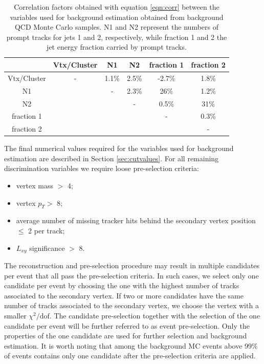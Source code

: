 \begin{table}[htbp]
\centering
\caption{Correlation factors obtained with equation \ref{eqn:corr} between the variables 
used for background estimation obtained from background QCD Monte
Carlo samples. N1 and N2 represent the numbers
of prompt tracks for jets 1 and 2, respectively, while fraction 1 and 2 the jet energy fraction carried by
prompt tracks.
\label{tab:corr}}
\begin{tabular}{c|ccccc}
 & Vtx/Cluster & N1 & N2 & fraction 1 & fraction 2 \\
\hline
Vtx/Cluster & - & 1.1\% & 2.5\% & -2.7\% & 1.8\%  \\
N1 & & - & 2.3\% & 26\%  & 1.2\% \\
N2 & & & - & 0.5\% & 31\% \\
fraction 1 & & & & - & 0.3\% \\
fraction 2 & & & & & - \\
\end{tabular}
\end{table}

The final numerical values required for the variables used for background estimation are described in Section 
\ref{sec:cutvalues}. For all remaining discrimination variables we require loose pre-selection criteria:   
\begin{itemize}
 \item vertex mass $>$ 4\GeV;
 \item vertex $p_T>$ 8\GeV;
 \item average number of missing tracker hits behind the secondary vertex position $\leq$ 2 per track;
 \item $L_{xy}$ significance $>$ 8.
\end{itemize}

The reconstruction and pre-selection procedure 
may result in multiple candidates per event that all pass
the pre-selection criteria. In such cases, we select only one candidate per event by
choosing the one with the highest number of tracks associated to the secondary vertex.
If two or more candidates have the same number of tracks associated to the secondary vertex,
we choose the vertex with a smaller $\chi^2/\text{dof}$. The candidate pre-selection together
with the selection of the 
one candidate per event will be further referred to as event pre-selection.
Only the 
properties of the one candidate are used for further selection and background estimation.
It is worth noting that
among the background MC events above 99\% of events contains only one candidate
after the pre-selection criteria are applied.

